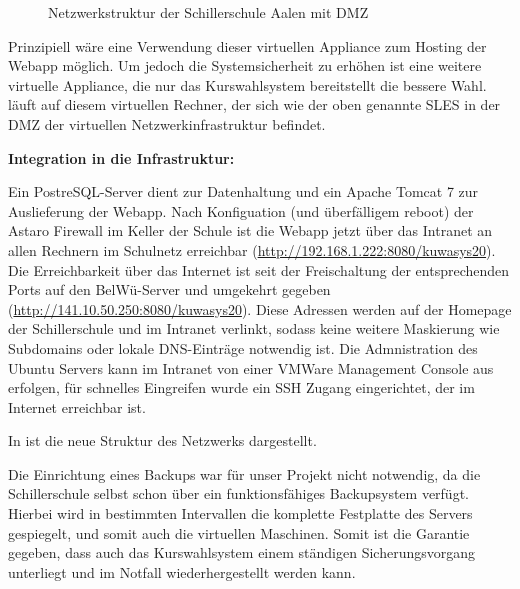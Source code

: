 \begin{figure}[H]
\begin{center}
\end{center}
\caption[\textbf{Netzwerkstruktur der Schillerschule Aalen}]{Netzwerkstruktur der Schillerschule Aalen mit DMZ}
\label{fig:Netzwerkstruktur}
\end{figure}

Prinzipiell wäre eine Verwendung dieser virtuellen \gls{Appliance} zum Hosting der \ac{Webapp} möglich. Um jedoch die Systemsicherheit zu erhöhen ist eine weitere virtuelle Appliance, die nur das Kurswahlsystem bereitstellt die bessere Wahl.
 läuft auf diesem virtuellen Rechner, der sich wie der oben genannte SLES in der \gls{DMZ} der virtuellen Netzwerkinfrastruktur befindet.

\textbf{Integration in die Infrastruktur:}

Ein PostreSQL-Server dient zur Datenhaltung und ein Apache Tomcat 7 zur Auslieferung der \ac{Webapp}. Nach Konfiguation (und überfälligem reboot) der Astaro Firewall im Keller der Schule ist die Webapp jetzt über das Intranet an allen Rechnern im Schulnetz erreichbar (\url{http://192.168.1.222:8080/kuwasys20}). Die Erreichbarkeit über das Internet ist seit der Freischaltung der entsprechenden Ports auf den BelWü-Server und umgekehrt gegeben (\url{http://141.10.50.250:8080/kuwasys20}).
Diese Adressen werden auf der Homepage der Schillerschule und im Intranet verlinkt, sodass keine weitere Maskierung wie Subdomains oder lokale DNS-Einträge notwendig ist.
Die Admnistration des Ubuntu Servers kann im Intranet von einer VMWare Management Console aus erfolgen, für schnelles Eingreifen wurde ein SSH Zugang eingerichtet, der im Internet erreichbar ist.

In  ist die neue Struktur des Netzwerks dargestellt.

Die Einrichtung eines Backups war für unser Projekt nicht notwendig, da die Schillerschule selbst schon über ein funktionsfähiges Backupsystem verfügt. Hierbei wird in bestimmten Intervallen die komplette Festplatte des Servers gespiegelt, und somit auch die virtuellen Maschinen.
Somit ist die Garantie gegeben, dass auch das Kurswahlsystem einem ständigen Sicherungsvorgang unterliegt und im Notfall wiederhergestellt werden kann.